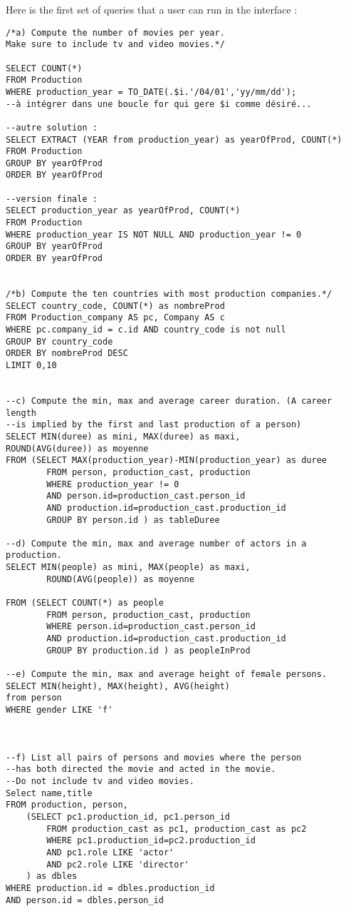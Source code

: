 \documentclass{article}
\begin{document}
\par Here is the first set of queries that a user can run in the interface :
\begin{lstlisting}
/*a) Compute the number of movies per year. 
Make sure to include tv and video movies.*/

SELECT COUNT(*) 
FROM Production 
WHERE production_year = TO_DATE(.$i.'/04/01','yy/mm/dd');
--à intégrer dans une boucle for qui gere $i comme désiré...

--autre solution :
SELECT EXTRACT (YEAR from production_year) as yearOfProd, COUNT(*)
FROM Production
GROUP BY yearOfProd
ORDER BY yearOfProd

--version finale :
SELECT production_year as yearOfProd, COUNT(*)
FROM Production
WHERE production_year IS NOT NULL AND production_year != 0
GROUP BY yearOfProd
ORDER BY yearOfProd


/*b) Compute the ten countries with most production companies.*/
SELECT country_code, COUNT(*) as nombreProd
FROM Production_company AS pc, Company AS c
WHERE pc.company_id = c.id AND country_code is not null
GROUP BY country_code
ORDER BY nombreProd DESC
LIMIT 0,10


--c) Compute the min, max and average career duration. (A career length 
--is implied by the first and last production of a person)
SELECT MIN(duree) as mini, MAX(duree) as maxi,
ROUND(AVG(duree)) as moyenne
FROM (SELECT MAX(production_year)-MIN(production_year) as duree
		FROM person, production_cast, production
		WHERE production_year != 0
        AND person.id=production_cast.person_id
        AND production.id=production_cast.production_id
		GROUP BY person.id ) as tableDuree

--d) Compute the min, max and average number of actors in a production.
SELECT MIN(people) as mini, MAX(people) as maxi,
        ROUND(AVG(people)) as moyenne

FROM (SELECT COUNT(*) as people
        FROM person, production_cast, production
        WHERE person.id=production_cast.person_id
        AND production.id=production_cast.production_id
        GROUP BY production.id ) as peopleInProd

--e) Compute the min, max and average height of female persons.
SELECT MIN(height), MAX(height), AVG(height)
from person
WHERE gender LIKE 'f'



--f) List all pairs of persons and movies where the person
--has both directed the movie and acted in the movie.
--Do not include tv and video movies.
Select name,title
FROM production, person,
	(SELECT pc1.production_id, pc1.person_id
		FROM production_cast as pc1, production_cast as pc2
		WHERE pc1.production_id=pc2.production_id
		AND pc1.role LIKE 'actor'
		AND pc2.role LIKE 'director'
	) as dbles
WHERE production.id = dbles.production_id
AND person.id = dbles.person_id



\end{lstlisting}
\end{document}
